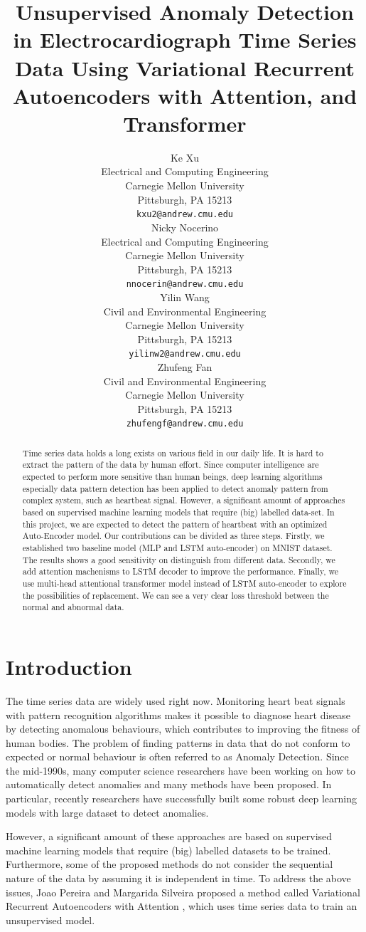 \documentclass{article}
\title{Unsupervised Anomaly Detection in Electrocardiograph Time Series Data Using Variational Recurrent Autoencoders with Attention, and Transformer}
\author{%
  Ke Xu \\
  Electrical and Computing Engineering\\
  Carnegie Mellon University\\
  Pittsburgh, PA 15213 \\
  \texttt{kxu2@andrew.cmu.edu} \\

  \And
  Nicky Nocerino \\
  Electrical and Computing Engineering\\
  Carnegie Mellon University\\
  Pittsburgh, PA 15213 \\
  \texttt{nnocerin@andrew.cmu.edu} \\

  \And
  Yilin Wang \\
  Civil and Environmental Engineering\\
  Carnegie Mellon University\\
  Pittsburgh, PA 15213 \\
  \texttt{yilinw2@andrew.cmu.edu} \\

  \And
  Zhufeng Fan \\
  Civil and Environmental Engineering\\
  Carnegie Mellon University\\
  Pittsburgh, PA 15213 \\
  \texttt{zhufengf@andrew.cmu.edu} \\
}
\begin{document}
\maketitle
\begin{abstract}

Time series data holds a long exists on various field in our daily life. It is hard to extract the pattern of the data by human effort. Since computer intelligence are
expected to perform more sensitive than human beings, deep learning algorithms especially data pattern detection has been applied to detect anomaly pattern from complex system, such as heartbeat signal. However, a significant amount of approaches based on supervised machine learning models that require (big) labelled data-set. In this project, we are expected to detect the pattern of heartbeat with an optimized Auto-Encoder model. Our contributions can be divided as three steps. Firstly, we established two baseline model (MLP and LSTM auto-encoder) on MNIST dataset. The results shows a good sensitivity on distinguish from different data.  Secondly, we add attention machenisms to LSTM decoder to improve the performance. Finally, we use multi-head attentional transformer model instead of LSTM auto-encoder to explore the possibilities of replacement.  We can see a very clear loss threshold between the normal and abnormal data.


\end{abstract}

\section{Introduction}
The time series data are widely used right now. Monitoring heart beat signals with pattern recognition algorithms makes it possible to diagnose heart disease by detecting anomalous behaviours, which contributes to improving the fitness of human bodies. The problem of finding patterns in data that do not conform to expected or normal behaviour is often referred to as Anomaly Detection. Since the mid-1990s, many computer science researchers have been working on how to automatically detect anomalies and many methods have been proposed. In particular, recently researchers have successfully built some robust deep learning models with large dataset to detect anomalies. 

However, a significant amount of these approaches are based on supervised machine learning models that require (big) labelled datasets to be trained. Furthermore, some of the proposed methods do not consider the sequential nature of the data by assuming it is independent in time. To address the above issues, Joao Pereira and Margarida Silveira proposed a method called Variational Recurrent Autoencoders with Attention \cite{AuthorJM}, which uses time series data to train an unsupervised model. 
\end{document}
